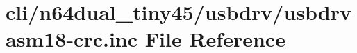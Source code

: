 \hypertarget{usbdrvasm18-crc_8inc}{\section{cli/n64dual\-\_\-tiny45/usbdrv/usbdrvasm18-\/crc.inc File Reference}
\label{usbdrvasm18-crc_8inc}
}
